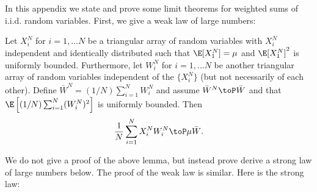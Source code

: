 In this appendix we state and prove some limit theorems for weighted sums
of i.i.d. random variables.  First, we give a weak law of large numbers:

\begin{lemma}\label{L:weak-weighted}
    Let $X_i^N$ for $i = 1, \ldots N$ be a triangular array of random variables
    with $X_i^N$ independent and identically distributed such that
    $\E[ X_1^N ] = \mu$ and $\E [ X_1^N ]^2$ is uniformly bounded.  
    Furthermore, let $W_i^N$ for $i = 1, \ldots N$ be another triangular array
    of random variables independent of the $\{ X_i^N \}$ (but not necessarily
    of each other).  Define $\bar W^N = (1/N) \sum_{i=1}^N W_i^N$ and assume
    $\bar W^N \toP \bar W$ and that
    $\E \left[ (1/N) \sum_{i=1}^N (W_i^N)^2 \right]$ is uniformly bounded.
    Then
    \[
        \frac{1}{N} \sum_{i=1}^N X_i^N W_i^N \toP \mu \bar W.
    \]
\end{lemma}

We do not give a proof of the above lemma, but instead prove derive a
strong law of large numbers below.  The proof of the weak law is 
similar.  Here is the strong law:

